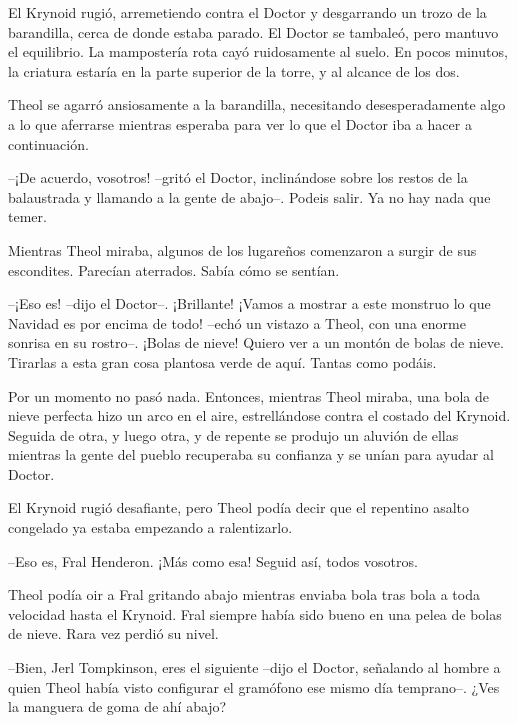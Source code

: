 El Krynoid rugió, arremetiendo contra el Doctor y desgarrando un trozo de la barandilla, cerca de donde estaba parado. El Doctor se tambaleó, pero mantuvo el equilibrio. La mampostería rota cayó ruidosamente al suelo. En pocos minutos, la criatura estaría en la parte superior de la torre, y al alcance de los dos.



Theol se agarró ansiosamente a la barandilla, necesitando desesperadamente algo a lo que aferrarse mientras esperaba para ver lo que el Doctor iba a hacer a continuación.



--¡De acuerdo, vosotros! --gritó el Doctor, inclinándose sobre los restos de la balaustrada y llamando a la gente de abajo--. Podeis salir. Ya no hay nada que temer.



Mientras Theol miraba, algunos de los lugareños comenzaron a surgir de sus escondites. Parecían aterrados. Sabía cómo se sentían.



--¡Eso es! --dijo el Doctor--. ¡Brillante! ¡Vamos a mostrar a este monstruo lo que Navidad es por encima de todo! --echó un vistazo a Theol, con una enorme sonrisa en su rostro--. ¡Bolas de nieve! Quiero ver a un montón de bolas de nieve. Tirarlas a esta gran cosa plantosa verde de aquí. Tantas como podáis.



Por un momento no pasó nada. Entonces, mientras Theol miraba, una bola de nieve perfecta hizo un arco en el aire, estrellándose contra el costado del Krynoid. Seguida de otra, y luego otra, y de repente se produjo un aluvión de ellas mientras la gente del pueblo recuperaba su confianza y se unían para ayudar al Doctor.



El Krynoid rugió desafiante, pero Theol podía decir que el repentino asalto congelado ya estaba empezando a ralentizarlo.



--Eso es, Fral Henderon. ¡Más como esa! Seguid así, todos vosotros.



Theol podía oir a Fral gritando abajo mientras enviaba bola tras bola a toda velocidad hasta el Krynoid. Fral siempre había sido bueno en una pelea de bolas de nieve. Rara vez perdió su nivel.



--Bien, Jerl Tompkinson, eres el siguiente --dijo el Doctor, señalando al hombre a quien Theol había visto configurar el gramófono ese mismo día temprano--. ¿Ves la manguera de goma de ahí abajo?



